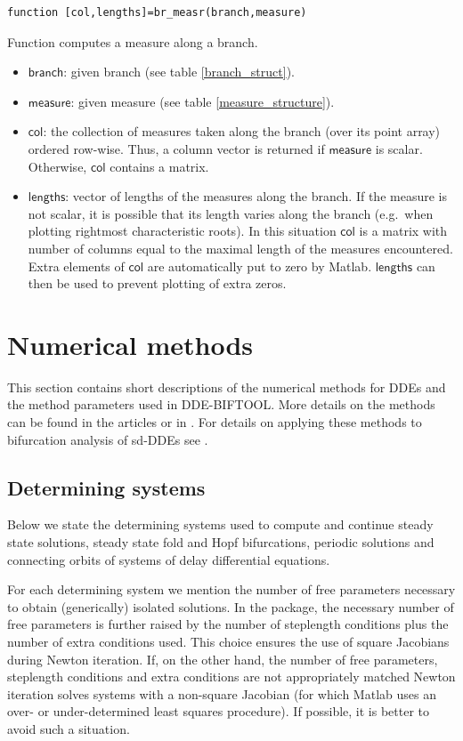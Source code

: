 \documentclass[10pt]{article}
\gdef \DDEBIFCODE{{\scshape DDE-BIFTOOL}}
\gdef \file#1{{\bfseries{\ttfamily{#1}}}}
\gdef \parm#1{{\mathsf{#1}}}
\begin{document}
{{\small\begin{verbatim}
function [col,lengths]=br_measr(branch,measure)
\end{verbatim}}
\noindent Function \file{br\_selec} computes a measure along a branch.
\begin{itemize}
\item $\parm{branch}$: given branch (see table \ref{branch_struct}).
\item $\parm{measure}$: given measure (see table \ref{measure_structure}).
\item $\parm{col}$: the collection of measures taken along the
branch (over its point array) ordered row-wise. Thus, a column vector
is returned if $\parm{measure}$ is scalar. Otherwise,
$\parm{col}$ contains a matrix.
\item $\parm{lengths}$: vector of lengths of the measures along the branch.
If the measure is not scalar, it is possible
that its length varies along the branch (e.g.~when plotting rightmost
characteristic roots). In this situation $\parm{col}$ is a matrix 
with number of columns equal to the maximal length of the measures encountered.
Extra elements of $\parm{col}$ are automatically put to zero by Matlab.
$\parm{lengths}$ can then be used to prevent plotting of extra zeros.
\end{itemize}

\section{Numerical methods}\label{numerical_methods}\label{code_num_methods}

This section contains short descriptions of the numerical methods 
for DDEs and the method parameters used in {\DDEBIFCODE}. 
More details on the methods can be found in the
articles \cite{Luzy96,Enge99a,Enge99b,en_d01,engel01,homoclinic} 
or in \cite{Enge00}. For details on applying these methods to bifurcation
analysis of sd-DDEs see \cite{luz01}.

\subsection{Determining systems}\label{determining_systems}

Below we state the determining systems used to compute and
continue steady state solutions, steady state fold and Hopf 
bifurcations, periodic solutions and connecting orbits of systems of delay
differential equations.

For each determining system we mention the number of free 
parameters necessary to obtain (generically) isolated 
solutions. 
In the package,
the necessary number of free parameters
is further raised by the number of
steplength conditions plus the number of extra conditions used.
This choice ensures 
the use of square Jacobians during Newton iteration. 
If, on the other hand, the number of free parameters, 
steplength conditions and extra conditions
are not appropriately matched Newton iteration solves systems with a   
non-square Jacobian (for which Matlab uses an
over- or under-determined
least squares procedure). 
If possible, it is better to avoid such a situation.

}
\end{document}

